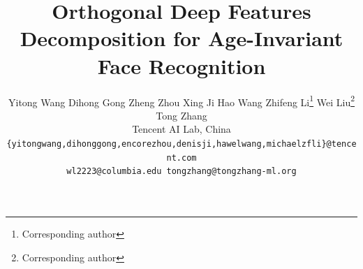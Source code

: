 \documentclass[runningheads]{llncs}
\newcommand*\samethanks[1][\value{footnote}]{\footnotemark[#1]}
\begin{document}
%
\title{Orthogonal Deep Features Decomposition for Age-Invariant Face Recognition} 

%
\author{
  Yitong Wang \quad Dihong Gong \quad Zheng Zhou \quad Xing Ji \quad Hao Wang \quad Zhifeng Li\thanks{Corresponding author} \quad Wei Liu\thanks{Corresponding author} \quad Tong Zhang\\
  Tencent AI Lab, China\\
  \texttt{\{yitongwang,dihonggong,encorezhou,denisji,hawelwang,michaelzfli\}@tencent.com} \\
    \texttt{wl2223@columbia.edu \quad tongzhang@tongzhang-ml.org} \\
}
%
%
\end{document}
